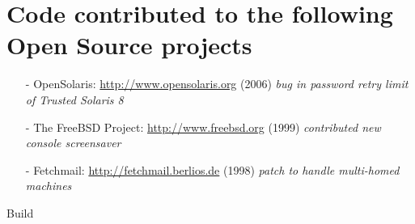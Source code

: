 \documentclass[letterpaper]{article}
\begin{document}
\section*{Code contributed to the following Open Source projects}

\begin{itemize}
	\item[-] OpenSolaris: \url{http://www.opensolaris.org} (2006) \emph{bug in password
		retry limit of Trusted Solaris 8}
	\item[-] The FreeBSD Project: \url{http://www.freebsd.org} (1999) \emph{contributed new
		console screensaver}
	\item[-] Fetchmail: \url{http://fetchmail.berlios.de} (1998) \emph{patch to handle multi-homed
		machines}
\end{itemize}

\vfill
{\tiny Build }
\end{document}
